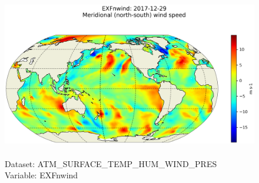 \begin{figure}[H]
\centering
\includegraphics[scale=0.5]{../images/plots/latlon_plots/Atmosphere_Surface_Temperature_Humidity_Wind_and_Pressure/EXFnwind.png}
\caption{\\Dataset: ATM\_SURFACE\_TEMP\_HUM\_WIND\_PRES\\Variable: EXFnwind}
\label{tab:table-ATM_SURFACE_TEMP_HUM_WIND_PRES_EXFnwind-Plot}
\end{figure}
\pagebreak
